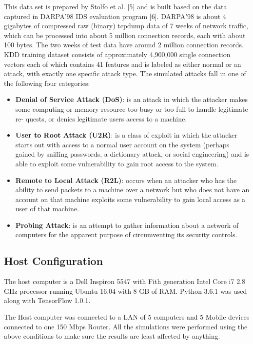\documentclass[12pt]{article}
\theoremstyle{definition}
\begin{document}
		This data set is prepared by Stolfo et al. [5] and is built
		based on the data captured in DARPA’98 IDS evaluation
		program [6]. DARPA’98 is about 4 gigabytes of compressed
		raw (binary) tcpdump data of 7 weeks of network traffic,
		which can be processed into about 5 million connection
		records, each with about 100 bytes. The two weeks of
		test data have around 2 million connection records. KDD
		training dataset consists of approximately 4,900,000 single
		connection vectors each of which contains 41 features and
		is labeled as either normal or an attack, with exactly one
		specific attack type. The simulated attacks fall in one of the
		following four categories:
		
		\begin{itemize}
			\item \textbf{Denial of Service Attack (DoS)}: is an attack in
			which the attacker makes some computing or memory
			resource too busy or too full to handle legitimate re-
			quests, or denies legitimate users access to a machine.
			\item \textbf{User to Root Attack (U2R)}: is a class of exploit in
			which the attacker starts out with access to a normal
			user account on the system (perhaps gained by sniffing
			passwords, a dictionary attack, or social engineering)
			and is able to exploit some vulnerability to gain root
			access to the system.
			\item  \textbf{Remote to Local Attack (R2L)}: occurs when an
			attacker who has the ability to send packets to a
			machine over a network but who does not have an
			account on that machine exploits some vulnerability to
			gain local access as a user of that machine.
			\item  \textbf{Probing Attack}: is an attempt to gather information
			about a network of computers for the apparent purpose
			of circumventing its security controls.
		\end{itemize}
		
		\subsection{Host Configuration}
		The host computer is a Dell Inspiron 5547 with Fith generation Intel Core i7 2.8 GHz processor running Ubuntu 16.04 with 8 GB of RAM. Python 3.6.1 was used along with TensorFlow 1.0.1.
		
		The Host computer was connected to a LAN of 5 computers and 5 Mobile devices connected to one 150 Mbps Router. All the simulations were performed using the above conditions to make sure the results are least affected by anything.
		
\end{document}
